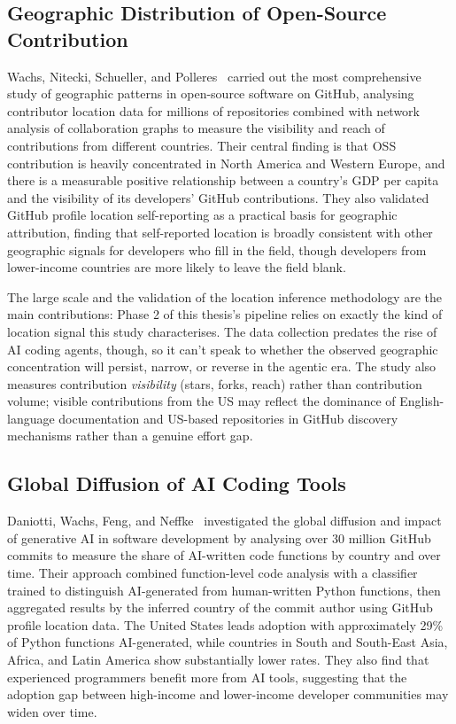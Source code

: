 \subsection{Geographic Distribution of Open-Source Contribution}

Wachs, Nitecki, Schueller, and Polleres~\cite{wachs2022} carried out the
most comprehensive study of geographic patterns in open-source software on GitHub,
analysing contributor location data for millions of repositories combined with
network analysis of collaboration graphs to measure the visibility and reach of
contributions from different countries. Their central finding is that OSS
contribution is heavily concentrated in North America and Western Europe, and there
is a measurable positive relationship between a country's GDP per capita and the
visibility of its developers' GitHub contributions. They also validated GitHub
profile location self-reporting as a practical basis for geographic attribution,
finding that self-reported location is broadly consistent with other geographic
signals for developers who fill in the field, though developers from lower-income
countries are more likely to leave the field blank.

The large scale and the validation of the location inference methodology are the main
contributions: Phase 2 of this thesis's pipeline relies on exactly the kind of
location signal this study characterises. The data collection predates the rise of AI
coding agents, though, so it can't speak to whether the observed geographic
concentration will persist, narrow, or reverse in the agentic era. The study also
measures contribution \emph{visibility} (stars, forks, reach) rather than contribution
volume; visible contributions from the US may reflect the dominance of English-language
documentation and US-based repositories in GitHub discovery mechanisms rather than a
genuine effort gap.

\subsection{Global Diffusion of AI Coding Tools}

Daniotti, Wachs, Feng, and Neffke~\cite{daniotti2025} investigated the global
diffusion and impact of generative AI in software development by analysing over
30 million GitHub commits to measure the share of AI-written code functions by
country and over time. Their approach combined function-level code analysis with
a classifier trained to distinguish AI-generated from human-written Python
functions, then aggregated results by the inferred country of the commit author
using GitHub profile location data. The United States leads adoption with
approximately 29\% of Python functions AI-generated, while countries in South and
South-East Asia, Africa, and Latin America show substantially lower rates. They
also find that experienced programmers benefit more from AI tools, suggesting that
the adoption gap between high-income and lower-income developer communities may
widen over time.

